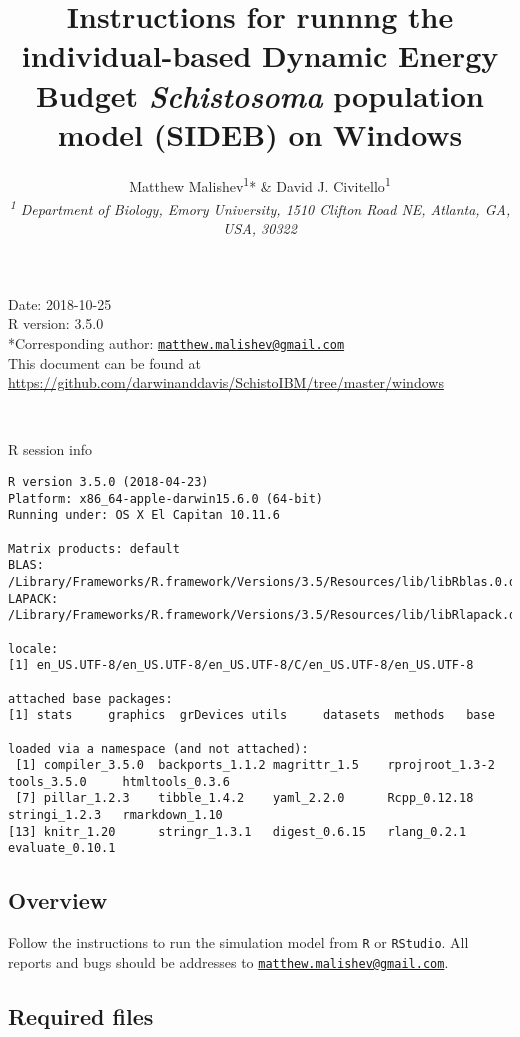 \documentclass[10,portrait]{article}
\title{Instructions for runnng the individual-based Dynamic Energy Budget
\emph{Schistosoma} population model (SIDEB) on Windows}
\author{Matthew Malishev\textsuperscript{1}* \& David J.
Civitello\textsuperscript{1}\\[2\baselineskip]\emph{\textsuperscript{1}
Department of Biology, Emory University, 1510 Clifton Road NE, Atlanta,
GA, USA, 30322}}
\date{}
\begin{document}
\maketitle

{
\hypersetup{linkcolor=black}
\setcounter{tocdepth}{4}
\tableofcontents
}
\newpage   

Date: 2018-10-25\\
R version: 3.5.0\\
*Corresponding author:
\href{mailto:matthew.malishev@gmail.com}{\nolinkurl{matthew.malishev@gmail.com}}\\
This document can be found at
\url{https://github.com/darwinanddavis/SchistoIBM/tree/master/windows}

~

R session info

\begin{verbatim}
R version 3.5.0 (2018-04-23)
Platform: x86_64-apple-darwin15.6.0 (64-bit)
Running under: OS X El Capitan 10.11.6

Matrix products: default
BLAS: /Library/Frameworks/R.framework/Versions/3.5/Resources/lib/libRblas.0.dylib
LAPACK: /Library/Frameworks/R.framework/Versions/3.5/Resources/lib/libRlapack.dylib

locale:
[1] en_US.UTF-8/en_US.UTF-8/en_US.UTF-8/C/en_US.UTF-8/en_US.UTF-8

attached base packages:
[1] stats     graphics  grDevices utils     datasets  methods   base     

loaded via a namespace (and not attached):
 [1] compiler_3.5.0  backports_1.1.2 magrittr_1.5    rprojroot_1.3-2 tools_3.5.0     htmltools_0.3.6
 [7] pillar_1.2.3    tibble_1.4.2    yaml_2.2.0      Rcpp_0.12.18    stringi_1.2.3   rmarkdown_1.10 
[13] knitr_1.20      stringr_1.3.1   digest_0.6.15   rlang_0.2.1     evaluate_0.10.1
\end{verbatim}

\newpage  

\subsection{Overview}\label{overview}

Follow the instructions to run the simulation model from \texttt{R} or
\texttt{RStudio}. All reports and bugs should be addresses to
\href{mailto:matthew.malishev@gmail.com}{\nolinkurl{matthew.malishev@gmail.com}}.

\subsection{Required files}\label{required-files}
\end{document}
